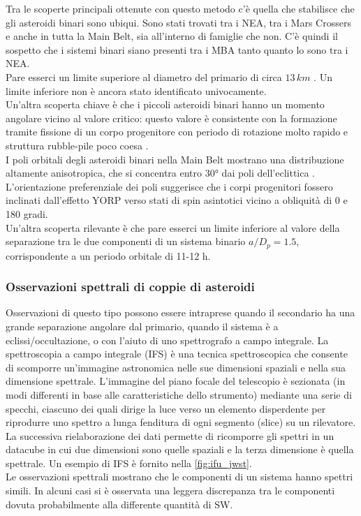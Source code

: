 Tra le scoperte principali ottenute con questo metodo c'è quella che stabilisce che gli asteroidi binari sono ubiqui. Sono stati trovati tra i NEA, tra i Mars Crossers e anche in tutta la Main Belt, sia all'interno di famiglie che non. C'è quindi il sospetto che i sistemi binari siano presenti tra i MBA tanto quanto lo sono tra i NEA.\\ Pare esserci un limite superiore al diametro del primario di circa $13\,km$ \citep{carry_small_2015}. Un limite inferiore non è ancora stato identificato univocamente.\\
Un'altra scoperta chiave è che i piccoli asteroidi binari hanno un momento angolare vicino al valore critico: questo valore è consistente con la formazione tramite fissione di un corpo progenitore con periodo di rotazione molto rapido e struttura rubble-pile poco coesa \citep{pravec_binary_2007}.\\
I poli orbitali degli asteroidi binari nella Main Belt mostrano una distribuzione altamente anisotropica, che si concentra entro 30° dai poli dell'eclittica \citep{pravec_binary_2012}. L'orientazione preferenziale dei poli suggerisce che i corpi progenitori fossero inclinati dall'effetto YORP verso stati di spin asintotici vicino a obliquità di 0 e 180 gradi.\\
Un'altra scoperta rilevante è che pare esserci un limite inferiore al valore della separazione tra le due componenti di un sistema binario $a/D_p=1.5$, corrispondente a un periodo orbitale di 11-12 h.\\

\subsubsection{Osservazioni spettrali di coppie di asteroidi}
Osservazioni di questo tipo possono essere intraprese quando il secondario ha una grande separazione angolare dal primario, quando il sistema è a eclissi/occultazione, o con l'aiuto di uno spettrografo a campo integrale. La spettroscopia a campo integrale (IFS) è una tecnica spettroscopica che consente di scomporre un'immagine astronomica nelle sue dimensioni spaziali e nella sua dimensione spettrale. L'immagine del piano focale del telescopio è sezionata (in modi differenti in base alle caratteristiche dello strumento) mediante una serie di specchi, ciascuno dei quali dirige la luce verso un elemento disperdente per riprodurre uno spettro a lunga fenditura di ogni segmento (slice) su un rilevatore. La successiva rielaborazione dei dati permette di ricomporre gli spettri in un datacube in cui due dimensioni sono quelle spaziali e la terza dimensione è quella spettrale. Un esempio di IFS è fornito nella \cref{fig:ifu_jwst}.\\
Le osservazioni spettrali mostrano che le componenti di un sistema hanno spettri simili. In alcuni casi si è osservata una leggera discrepanza tra le componenti dovuta probabilmente alla differente quantità di SW.

